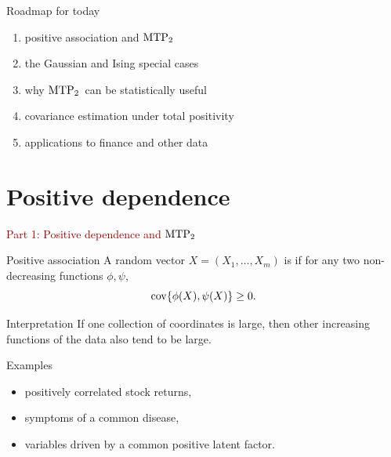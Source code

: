 \documentclass[dvipsnames,aspectratio=169,handout]{beamer}
\begin{document}
\begin{frame}{Roadmap for today}
\begin{enumerate}
    \item positive association and ${\rm MTP}_{2}$
    \item the Gaussian and Ising special cases
    \item why ${\rm MTP}_{2}$\ can be statistically useful
    \item covariance estimation under total positivity
    \item applications to finance and other data
\end{enumerate}
\end{frame}


\section{Positive dependence}

\begin{frame}{}
\begin{center}
{\Huge \textcolor{DarkRed}{Part 1: Positive dependence and ${\rm MTP}_{2}$}}
\end{center}
\end{frame}

\begin{frame}{Positive association}
A random vector $X=(X_1,\ldots,X_m)$ is  if
for any two non-decreasing functions $\phi,\psi$,
\[
\operatorname{cov}\{\phi(X),\psi(X)\}\geq 0.
\]

\begin{block}{Interpretation}
If one collection of coordinates is large, then other increasing functions of the data also tend to be large.
\end{block}

\begin{alertblock}{Examples}
\begin{itemize}
    \item positively correlated stock returns,
    \item symptoms of a common disease,
    \item variables driven by a common positive latent factor.
\end{itemize}
\end{alertblock}
\end{frame}
\end{document}
